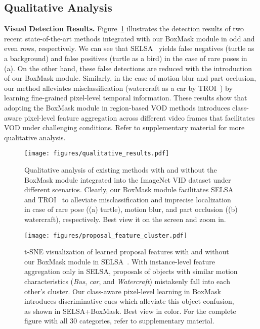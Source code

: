 \documentclass[10pt,twocolumn,letterpaper]{article}
\begin{document}
\subsection{Qualitative Analysis}

\vspace{3pt}
\noindent \textbf{Visual Detection Results.} Figure~\ref{fig:qual_results} illustrates the detection results of two recent state-of-the-art methods integrated with our BoxMask module in odd and even rows, respectively. We can see that SELSA~\cite{wu2019sequence} yields false negatives (turtle as a background) and false positives (turtle as a bird) in the case of rare poses in (a). On the other hand, these false detections are reduced with the introduction of our BoxMask module. Similarly, in the case of motion blur and part occlusion, our method alleviates misclassification (watercraft as a car by TROI~\cite{gong2021temporal}) by learning fine-grained pixel-level temporal information. These results show that adopting the BoxMask module in region-based VOD methods introduces class-aware pixel-level feature aggregation across different video frames that facilitates VOD under challenging conditions. Refer to supplementary material for more qualitative analysis.

\begin{figure}
\vspace{-10 pt}
\begin{center}
\texttt{[image: figures/qualitative\_results.pdf]}
\caption{Qualitative analysis of existing methods with and without the BoxMask module integrated into the ImageNet VID dataset under different scenarios. Clearly, our BoxMask module facilitates SELSA~\cite{wu2019sequence} and TROI~\cite{gong2021temporal} to alleviate misclassification and imprecise localization in case of rare pose ((a) turtle), motion blur, and part occlusion ((b) watercraft), respectively. Best view it on the screen and zoom in.}
\label{fig:qual_results}
\end{center}
\vspace{-20pt}
\end{figure}


\begin{figure*}
\begin{center}
\texttt{[image: figures/proposal\_feature\_cluster.pdf]}
\caption{t-SNE visualization of learned proposal features with and without our BoxMask module in SELSA~\cite{wu2019sequence}. With instance-level feature aggregation only in SELSA, proposals of objects with similar motion characteristics (\textit{Bus}, \textit{car}, and \textit{Watercraft}) mistakenly fall into each other's cluster. Our class-aware pixel-level learning in BoxMask introduces discriminative cues which alleviate this object confusion, as shown in SELSA+BoxMask. Best view in color. For the complete figure with all 30 categories, refer to supplementary material.}
\label{fig:tsne_vis}
\end{center}
\vspace{-20pt}
\end{figure*}
\end{document}
